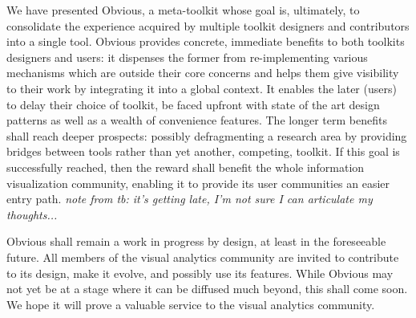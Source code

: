 
We have presented Obvious, a meta-toolkit whose goal is, ultimately,
to consolidate the experience acquired by multiple toolkit designers
and contributors into a single tool. Obvious provides concrete,
immediate benefits to both toolkits designers and users: it dispenses
the former from re-implementing various mechanisms which are outside
their core concerns and helps them give visibility to their work by
integrating it into a global context. It enables the later (users) to
delay their choice of toolkit, be faced upfront with state of the art
design patterns as well as a wealth of convenience features. The
longer term benefits shall reach deeper prospects: possibly
defragmenting a research area by providing bridges between tools
rather than yet another, competing, toolkit. If this goal is
successfully reached, then the reward shall benefit the whole
information visualization community, enabling it to provide its user
communities an easier entry path. \emph{note from tb: it's getting
late, I'm not sure I can articulate my thoughts...}

Obvious shall remain a work in progress by design, at least in the
foreseeable future. All members of the visual analytics community are
invited to contribute to its design, make it evolve, and possibly use
its features. While Obvious may not yet be at a stage where it can be
diffused much beyond, this shall come soon. We hope it will prove a
valuable service to the visual analytics community.
